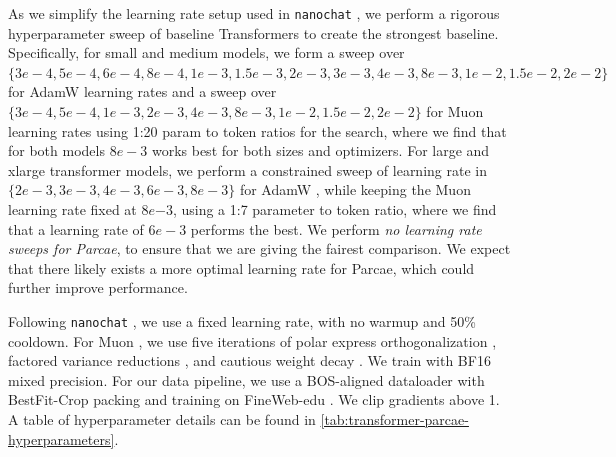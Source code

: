 As we simplify the learning rate setup used in \texttt{nanochat} \citep{nanochat}, we perform a rigorous hyperparameter sweep of baseline Transformers to create the strongest baseline. Specifically, for small and medium models, we form a sweep over $\{3e-4, 5e-4, 6e-4, 8e-4, 1e-3, 1.5e-3, 2e-3, 3e-3, 4e-3, 8e-3, 1e-2, 1.5e-2, 2e-2 \}$ for AdamW learning rates and a sweep over $\{3e-4, 5e-4, 1e-3, 2e-3, 4e-3, 8e-3, 1e-2, 1.5e-2, 2e-2\}$ for Muon learning rates using 1:20 param to token ratios for the search, where we find that for both models $8e-3$ works best for both sizes and optimizers. For large and xlarge transformer models, we perform a constrained sweep of learning rate in $\{2e-3, 3e-3, 4e-3, 6e-3, 8e-3\}$ for AdamW \citep{kingma2017adammethodstochasticoptimization}, while keeping the Muon learning rate fixed at $8e{-3}$, using a 1:7 parameter to token ratio, where we find that a learning rate of $6e-3$ performs the best. We perform \emph{no learning rate sweeps for Parcae}, to ensure that we are giving the fairest comparison. We expect that there likely exists a more optimal learning rate for Parcae, which could further improve performance.

Following \texttt{nanochat} \citep{nanochat}, we use a fixed learning rate, with no warmup and 50\% cooldown. For Muon \citep{jordan2024muon}, we use five iterations of polar express orthogonalization \citep{amsel2025polarexpressoptimalmatrix}, factored variance reductions \citep{si2025adamuonadaptivemuonoptimizer}, and cautious weight decay \citep{chen2026cautiousweightdecay}. We train with BF16 mixed precision. For our data pipeline, we use a BOS-aligned dataloader with BestFit-Crop packing \citep{ding2024fewertruncationsimprovelanguage} and training on FineWeb-edu \citep{penedo2024finewebdatasetsdecantingweb}. We clip gradients above 1.
A table of hyperparameter details can be found in \cref{tab:transformer-parcae-hyperparameters}. 



